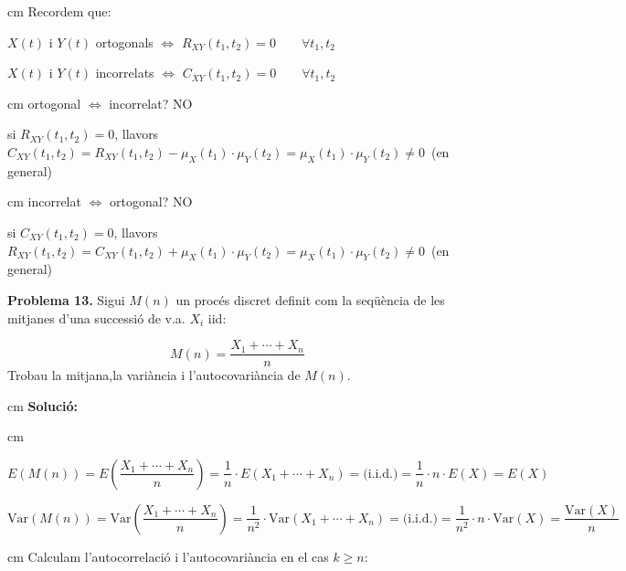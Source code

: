 \documentclass{article}
\begin{document}
 cm
\noindent
Recordem que:

$X(t)$ i $Y(t)$ ortogonals $\Longleftrightarrow$ $R_{XY}(t_1, t_2) = 0 \qquad \forall t_1, t_2$

$X(t)$ i $Y(t)$ incorrelats $\Longleftrightarrow$ $C_{XY}(t_1, t_2) = 0 \qquad \forall t_1, t_2$

 cm
\noindent
ortogonal $\Longleftrightarrow$ incorrelat? NO

si $R_{XY}(t_1, t_2) = 0$, llavors 
$C_{XY}(t_1, t_2) =R_{XY}(t_1, t_2)-\mu_X(t_1) \cdot \mu_Y(t_2)=\mu_X(t_1) \cdot \mu_Y(t_2) \neq 0 \,$
 (en general)

 
 cm
\noindent
incorrelat $\Longleftrightarrow$ ortogonal? NO

si $C_{XY}(t_1, t_2) = 0$, llavors 
$R_{XY}(t_1, t_2) =C_{XY}(t_1, t_2)+\mu_X(t_1) \cdot \mu_Y(t_2)=\mu_X(t_1) \cdot \mu_Y(t_2) \neq 0 \,$
 (en general)

\newpage

\noindent
\textbf{Problema 13.}  
Sigui $M(n)$ un proc\'es discret definit com la seq\"{u}\`encia de
les mitjanes d'una successi\'o de v.a. $X_i$ iid:

$$M(n)=\frac{X_{1}+\cdots +X_{n}}{n}$$
Trobau la mitjana,la vari\`ancia i l'autocovari\`ancia de $M(n)$.

 cm
\noindent
\textbf{Soluci\'o:}

 cm
\noindent

\[
E(M(n))=E \left( \frac{X_{1}+\cdots +X_{n}}{n} \right)=\frac{1}{n} \cdot  E(X_1+\cdots+X_n)=\text{(i.i.d.)}=
\frac{1}{n} \cdot n \cdot E(X)=E(X)
\]

\[
\mathrm{Var}(M(n))=\mathrm{Var} \left( \frac{X_{1}+\cdots +X_{n}}{n} \right)=\frac{1}{n^2} \cdot  \mathrm{Var}(X_1+\cdots+X_n)=\text{(i.i.d.)}=
\frac{1}{n^2} \cdot n \cdot \mathrm{Var}(X)=\frac{\mathrm{Var}(X)}{n}
\]

 cm
\noindent
Calculam l'autocorrelaci\'o i l'autocovari\`ancia en el cas $k \geq n$:
\end{document}
